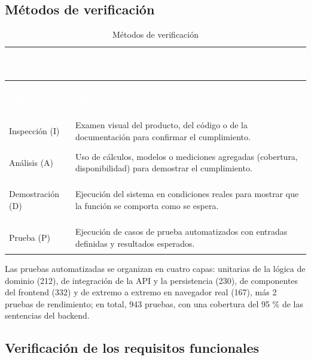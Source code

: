 \documentclass[11pt,a4paper,oneside]{article}
\begin{document}
\subsection{Métodos de verificación}

{\small
\begin{xltabular}{\textwidth}{@{}>{\sffamily\bfseries\raggedright\arraybackslash}p{3.6cm}Y@{}}
\caption{Métodos de verificación}\label{tab:metodos}\\
\textcolor{white}{\sffamily\bfseries\footnotesize Método} & \textcolor{white}{\sffamily\bfseries\footnotesize Descripción}\\
\endfirsthead
{}\\
\textcolor{white}{\sffamily\bfseries\footnotesize Método} & \textcolor{white}{\sffamily\bfseries\footnotesize Descripción}\\
\endhead
Inspección (I) & Examen visual del producto, del código o de la documentación para confirmar el cumplimiento.\\ \hline
{}Análisis (A) & Uso de cálculos, modelos o mediciones agregadas (cobertura, disponibilidad) para demostrar el cumplimiento.\\ \hline
Demostración (D) & Ejecución del sistema en condiciones reales para mostrar que la función se comporta como se espera.\\ \hline
{}Prueba (P) & Ejecución de casos de prueba automatizados con entradas definidas y resultados esperados.\\ \hline
\end{xltabular}}
\vspace{0.6em}

Las pruebas automatizadas se organizan en cuatro capas: unitarias de la lógica de dominio (212), de integración de la API y la persistencia (230), de componentes del frontend (332) y de extremo a extremo en navegador real (167), más 2 pruebas de rendimiento; en total, 943 pruebas, con una cobertura del 95 \% de las sentencias del backend.



\subsection{Verificación de los requisitos funcionales}
\end{document}
